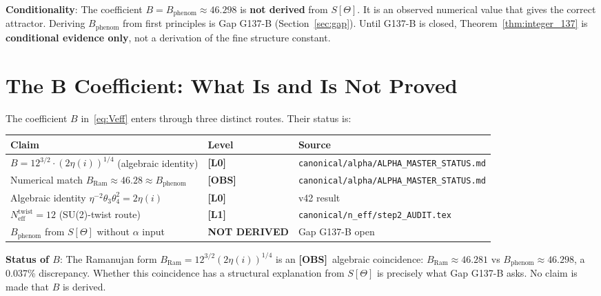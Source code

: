 \documentclass[12pt,a4paper]{article}
\theoremstyle{definition}
\theoremstyle{remark}
\newcommand{\Lzero}{\textbf{[L0]}}
\newcommand{\Lone}{\textbf{[L1]}}
\newcommand{\OBS}{\textbf{[OBS]}}
\begin{document}
\begin{gapbox}
\textbf{Conditionality}: The coefficient $B = B_{\mathrm{phenom}} \approx 46.298$
is \textbf{not derived} from $S[\Theta]$.  It is an observed numerical value
that gives the correct attractor.  Deriving $B_{\mathrm{phenom}}$ from first
principles is Gap G137-B (Section~\ref{sec:gap}).  Until G137-B is closed,
Theorem~\ref{thm:integer_137} is \textbf{conditional evidence only}, not a
derivation of the fine structure constant.
\end{gapbox}

\section{The B Coefficient: What Is and Is Not Proved}
\label{sec:B}

The coefficient $B$ in~\eqref{eq:Veff} enters through three distinct routes.
Their status is:

\begin{center}
\begin{tabular}{lll}
\toprule
\textbf{Claim} & \textbf{Level} & \textbf{Source} \\
\midrule
$B = 12^{3/2}\cdot(2\eta(i))^{1/4}$ (algebraic identity) &
  \Lzero & \texttt{canonical/alpha/ALPHA\_MASTER\_STATUS.md} \\
Numerical match $B_{\mathrm{Ram}} \approx 46.28 \approx B_{\mathrm{phenom}}$ &
  \OBS & \texttt{canonical/alpha/ALPHA\_MASTER\_STATUS.md} \\
Algebraic identity $\eta^{-2}\theta_3\theta_4^2 = 2\eta(i)$ &
  \Lzero & v42 result \\
$N_{\mathrm{eff}}^{\mathrm{twist}} = 12$ (SU(2)-twist route) &
  \Lone & \texttt{canonical/n\_eff/step2\_AUDIT.tex} \\
$B_{\mathrm{phenom}}$ from $S[\Theta]$ without $\alpha$ input &
  \textbf{NOT DERIVED} & Gap G137-B open \\
\bottomrule
\end{tabular}
\end{center}

\begin{insightbox}
\textbf{Status of $B$}: The Ramanujan form $B_{\mathrm{Ram}} = 12^{3/2}(2\eta(i))^{1/4}$
is an \OBS\ algebraic coincidence: $B_{\mathrm{Ram}} \approx 46.281$ vs
$B_{\mathrm{phenom}} \approx 46.298$, a 0.037\% discrepancy.  Whether this
coincidence has a structural explanation from $S[\Theta]$ is precisely
what Gap G137-B asks.  No claim is made that $B$ is derived.
\end{insightbox}
\end{document}
